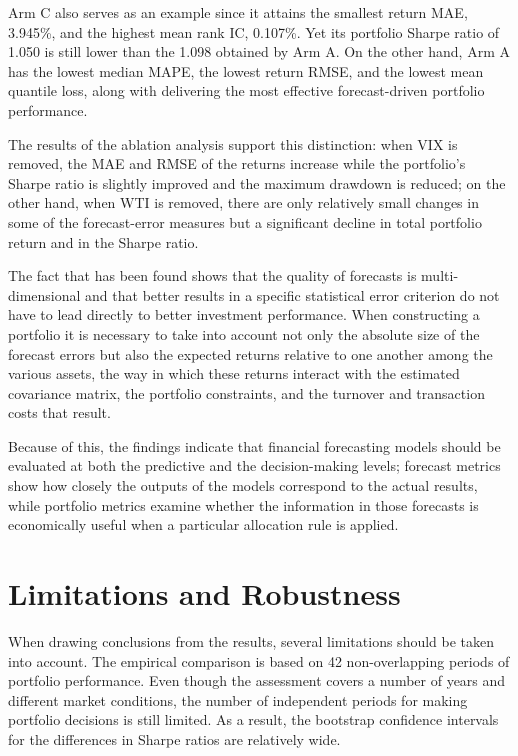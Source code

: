\documentclass[12pt,a4paper,twoside,openany]{book}
\begin{document}
Arm C also serves as an example since it attains the smallest return MAE, 3.945\%, and the highest mean rank IC, 0.107\%. Yet its portfolio Sharpe ratio of 1.050 is still lower than the 1.098 obtained by Arm A. On the other hand, Arm A has the lowest median MAPE, the lowest return RMSE, and the lowest mean quantile loss, along with delivering the most effective forecast-driven portfolio performance.

The results of the ablation analysis support this distinction: when VIX is removed, the MAE and RMSE of the returns increase while the portfolio's Sharpe ratio is slightly improved and the maximum drawdown is reduced; on the other hand, when WTI is removed, there are only relatively small changes in some of the forecast-error measures but a significant decline in total portfolio return and in the Sharpe ratio.

The fact that has been found shows that the quality of forecasts is multi-dimensional and that better results in a specific statistical error criterion do not have to lead directly to better investment performance. When constructing a portfolio it is necessary to take into account not only the absolute size of the forecast errors but also the expected returns relative to one another among the various assets, the way in which these returns interact with the estimated covariance matrix, the portfolio constraints, and the turnover and transaction costs that result.

Because of this, the findings indicate that financial forecasting models should be evaluated at both the predictive and the decision-making levels; forecast metrics show how closely the outputs of the models correspond to the actual results, while portfolio metrics examine whether the information in those forecasts is economically useful when a particular allocation rule is applied.

\section{Limitations and
Robustness}\label{limitations-and-robustness}

When drawing conclusions from the results, several limitations should be taken into account. The empirical comparison is based on 42 non-overlapping periods of portfolio performance. Even though the assessment covers a number of years and different market conditions, the number of independent periods for making portfolio decisions is still limited. As a result, the bootstrap confidence intervals for the differences in Sharpe ratios are relatively wide.
\end{document}
